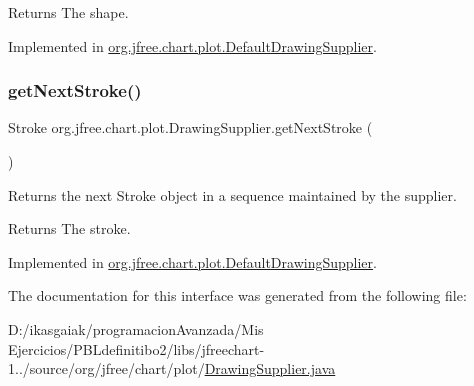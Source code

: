 \begin{DoxyReturn}{Returns}
The shape. 
\end{DoxyReturn}


Implemented in \mbox{\hyperlink{classorg_1_1jfree_1_1chart_1_1plot_1_1_default_drawing_supplier_ada83bbc7e56d31ce1c49da7d51baf313}{org.\+jfree.\+chart.\+plot.\+Default\+Drawing\+Supplier}}.

\mbox{\label{interfaceorg_1_1jfree_1_1chart_1_1plot_1_1_drawing_supplier_a5e3b2ef52841d31b514d27c954bea536}} 
\subsubsection{\texorpdfstring{get\+Next\+Stroke()}{getNextStroke()}}
{\footnotesize\ttfamily Stroke org.\+jfree.\+chart.\+plot.\+Drawing\+Supplier.\+get\+Next\+Stroke (\begin{DoxyParamCaption}{ }\end{DoxyParamCaption})}

Returns the next {\ttfamily Stroke} object in a sequence maintained by the supplier.

\begin{DoxyReturn}{Returns}
The stroke. 
\end{DoxyReturn}


Implemented in \mbox{\hyperlink{classorg_1_1jfree_1_1chart_1_1plot_1_1_default_drawing_supplier_adbe0467f0c53618cda9c1ec0d69143dd}{org.\+jfree.\+chart.\+plot.\+Default\+Drawing\+Supplier}}.



The documentation for this interface was generated from the following file\+:\begin{DoxyCompactItemize}
\item 
D\+:/ikasgaiak/programacion\+Avanzada/\+Mis Ejercicios/\+P\+B\+Ldefinitibo2/libs/jfreechart-\/1../source/org/jfree/chart/plot/\mbox{\hyperlink{_drawing_supplier_8java}{Drawing\+Supplier.\+java}}\end{DoxyCompactItemize}

